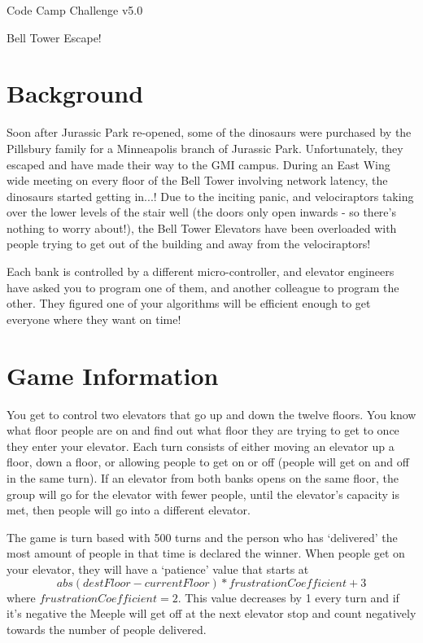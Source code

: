 \documentclass{article}
\begin{document}
\centerline{\sc \large Code Camp Challenge v5.0}
\vspace{.5pc}
\centerline{\sc Bell Tower Escape!}
\vspace{2pc}

\section*{Background}
Soon after Jurassic Park re-opened, some of the dinosaurs were purchased by the Pillsbury family for a Minneapolis branch of Jurassic Park. Unfortunately, they escaped and have made their way to the GMI campus. During an East Wing wide meeting on every floor of the Bell Tower involving network latency, the dinosaurs started getting in...! Due to the inciting panic, and velociraptors taking over the lower levels of the stair well (the doors only open inwards - so there's nothing to worry about!), the Bell Tower Elevators have been overloaded with people trying to get out of the building and away from the velociraptors!

Each bank is controlled by a different micro-controller, and elevator engineers have asked you to program one of them, and another colleague to program the other. They figured one of your algorithms will be efficient enough to get everyone where they want on time!

\section*{Game Information}
You get to control two elevators that go up and down the twelve floors. You know what floor people are on and find out what floor they are trying to get to once they enter your elevator. Each turn consists of either moving an elevator up a floor, down a floor, or allowing people to get on or off (people will get on and off in the same turn). If an elevator from both banks opens on the same floor, the group will go for the elevator with fewer people, until the elevator's capacity is met, then people will go into a different elevator.

The game is turn based with 500 turns and the person who has `delivered' the most amount of people in that time is declared the winner. When people get on your elevator, they will have a `patience' value that starts at $$abs(destFloor-currentFloor) * frustrationCoefficient + 3$$ where $frustrationCoefficient = 2$. This value decreases by 1 every turn and if it's negative the Meeple will get off at the next elevator stop and count negatively towards the number of people delivered.
\end{document}
